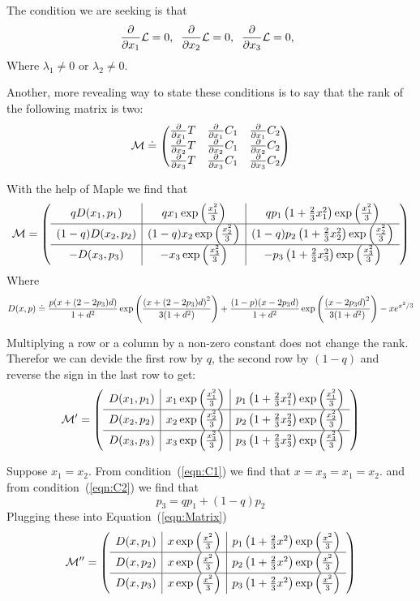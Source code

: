 \documentclass{article}[12pt]
\theoremstyle{plain}
\begin{document}
The condition we are seeking is that
\newcommand{\parti}[1]{\frac{\partial}{\partial #1}} 
\[
\parti{x_1} \Lag=0,\;\;
\parti{x_2} \Lag=0,\;\;
\parti{x_3} \Lag=0,\;\;
\]
Where $\lambda_1\neq 0$ or $\lambda_2 \neq 0$.

Another, more revealing way to state these conditions is to say that
the rank of the following matrix is two:
\newcommand{\Mlag}{{\cal M}}
\begin{equation}
\Mlag \doteq
\begin{pmatrix}
 \parti{x_1} T & \parti{x_1} C_1 & \parti{x_1} C_2\\
 \parti{x_2} T & \parti{x_2} C_1 & \parti{x_2} C_2\\
 \parti{x_3} T & \parti{x_3} C_1 & \parti{x_3} C_2
 \end{pmatrix} 
\end{equation}

With the help of Maple we find that 
\begin{equation}
\Mlag=
\paren{
\begin{array}{c|c|c}
q \dT{x_1,p_1} & q x_1 \potExpr{x_1}{} &
q \thirdCol{x_1}{p_1} \\
\hline
(1-q) \dT{x_2,p_2} & (1-q) x_2 \potExpr{x_2}{} &
(1-q) \thirdCol{x_2}{p_2} \\
\hline
- \dT{x_3,p_3} & - x_3 \potExpr{x_3}{} &
- \thirdCol{x_3}{p_3} \\
\end{array}
}
\label{eqn:Matrix}
\end{equation}
Where
\begin{equation}
D(x,p) \doteq 
\frac{p(x+(2-2p_3)d)}{1+d^2}\exp\left( \frac{\left( x+(2-2p_3)d \right)^2}{3(1+d^2)} \right)
+
\frac{(1-p)(x-2p_3d)}{1+d^2}\exp\left( \frac{\left( x-2p_3d \right)^2}{3(1+d^2)} \right)
- x e^{x^2 / 3}
\label{eqn:DT}
\end{equation}

Multiplying a row or a column by a non-zero constant does not change
the rank. Therefor we can devide the first row by $q$, the second row
by $(1-q)$ and reverse the sign in the last row to get:
\[
\Mlag' =
\paren{
\begin{array}{c|c|c}
\dT{x_1,p_1} & x_1 \potExpr{x_1}{} &
\thirdCol{x_1}{p_1} \\
\hline
\dT{x_2,p_2} & x_2 \potExpr{x_2}{} &
\thirdCol{x_2}{p_2} \\
\hline
\dT{x_3,p_3} & x_3 \potExpr{x_3}{} &
\thirdCol{x_3}{p_3}
\end{array}
}
\]

Suppose $x_1=x_2$. From condition~(\ref{eqn:C1}) we find that
$x=x_3=x_1=x_2$. and from condition~(\ref{eqn:C2}) we find that
\[
p_3 = q p_1 + (1-q) p_2
\]  
Plugging these into Equation~(\ref{eqn:Matrix})
\[
\Mlag'' =
\paren{
\begin{array}{c|c|c}
\dT{x,p_1} & x \potExpr{x}{} &
\thirdCol{x}{p_1} \\
\hline
\dT{x,p_2} & x \potExpr{x}{} &
\thirdCol{x}{p_2} \\
\hline
\dT{x,p_3} & x \potExpr{x}{} &
\thirdCol{x}{p_3} \\
\end{array}
}
\]
\end{document}
